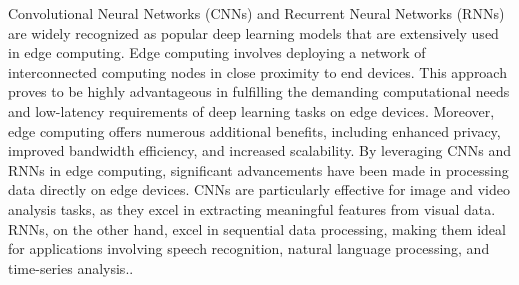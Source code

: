 Convolutional Neural Networks (CNNs) and Recurrent Neural Networks (RNNs) are widely recognized as popular deep learning models that are extensively used in edge computing. Edge computing involves deploying a network of interconnected computing nodes in close proximity to end devices. This approach proves to be highly advantageous in fulfilling the demanding computational needs and low-latency requirements of deep learning tasks on edge devices. Moreover, edge computing offers numerous additional benefits, including enhanced privacy, improved bandwidth efficiency, and increased scalability. By leveraging CNNs and RNNs in edge computing, significant advancements have been made in processing data directly on edge devices. CNNs are particularly effective for image and video analysis tasks, as they excel in extracting meaningful features from visual data. RNNs, on the other hand, excel in sequential data processing, making them ideal for applications involving speech recognition, natural language processing, and time-series analysis.\cite{8763885}. 





